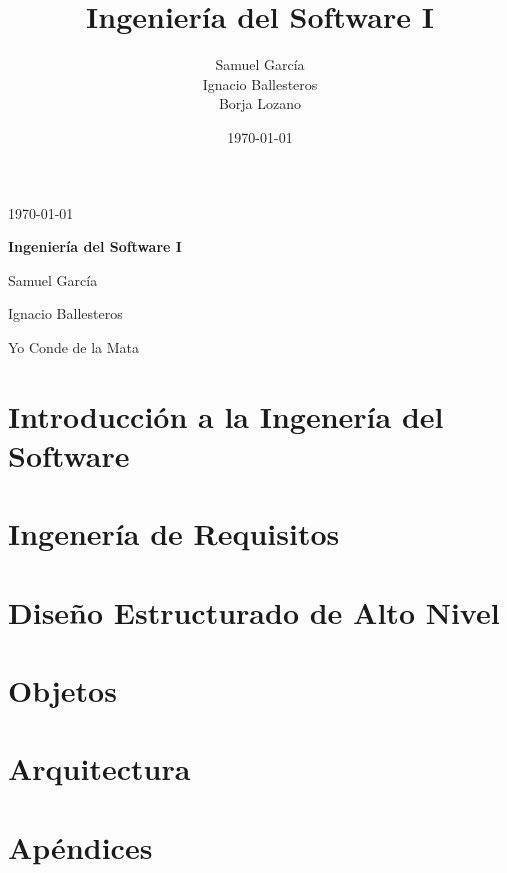 \documentclass[12pt,a4paper]{report}
\title{Ingeniería del Software I}
\author{Samuel García \\ Ignacio Ballesteros \\ Borja Lozano}
\date{\today}
\begin{document}
\begin{titlepage}
	\hfill \today

	\vspace{.2\textheight}

	\begin{center}
		{\huge\bfseries Ingeniería del Software I\par}
		\vspace{3cm}
		Samuel García \par
		Ignacio Ballesteros \par
                Yo Conde de la Mata \par
	\end{center}

\end{titlepage}\tableofcontents


\chapter{Introducción a la Ingenería del Software}
\label{chap:introduccion}

\chapter{Ingenería de Requisitos}
\label{chap:requisitos}


\chapter{Diseño Estructurado de Alto Nivel}
\label{chap:estructurado}


\chapter{Objetos}
\label{chap:objetos}


\chapter{Arquitectura}
\label{chap:arquitectura}



\chapter{Apéndices}
\end{document}
